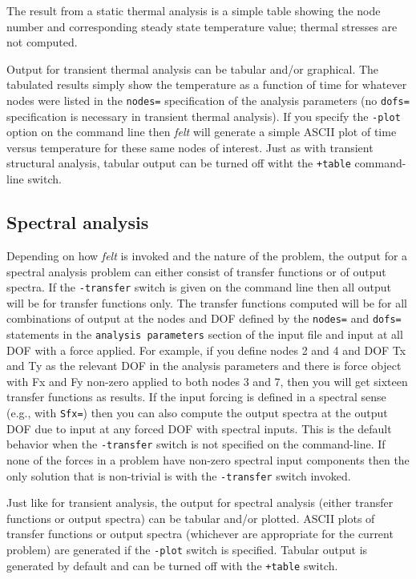 The result from a static thermal analysis is a simple table showing the
node number and corresponding steady state temperature value; thermal
stresses are not computed.

Output for transient thermal analysis can be tabular and/or graphical.
The tabulated results simply show the temperature as a function of time
for whatever nodes were listed in the {\tt nodes=} specification of the
analysis parameters (no {\tt dofs=} specification is necessary in 
transient thermal analysis).  If you specify the {\tt -plot} option on the
command line then {\em felt} will generate a simple ASCII plot of
time versus temperature for these same nodes of interest.  Just as
with transient structural analysis, tabular output can be turned off
witht the {\tt +table} command-line switch.

\subsection{Spectral analysis}

Depending on how {\em felt} is invoked and the nature of the problem, the
output for a spectral analysis problem can either consist of transfer
functions or of output spectra.  If the {\tt -transfer} switch is given
on the command line then all output will be for transfer functions only.
The transfer functions computed will be for all combinations of output at the 
nodes and DOF defined by the {\tt nodes=} and {\tt dofs=} statements in the
{\tt analysis parameters} section of the input file and input at all DOF
with a force applied.  For example, if you define nodes 2 and 4
and DOF Tx and Ty as the relevant DOF in the analysis parameters and
there is force object with Fx and Fy non-zero applied to both nodes 3 and 7,
then you will get sixteen transfer functions as results.  If the input
forcing is defined in a spectral sense (e.g., with {\tt Sfx=}) then
you can also compute the output spectra at the output DOF due to input
at any forced DOF with spectral inputs.  This is the default behavior when
the {\tt -transfer} switch is not specified on the command-line.  If none
of the forces in a problem have non-zero spectral input components then
the only solution that is non-trivial is with the {\tt -transfer} switch
invoked.

Just like for transient analysis, the output for spectral analysis (either
transfer functions or output spectra) can be tabular and/or plotted.  
ASCII plots of transfer functions or output spectra (whichever are appropriate
for the current problem) are generated if the {\tt -plot} switch is specified.
Tabular output is generated by default and can be turned off with the
{\tt +table} switch.
